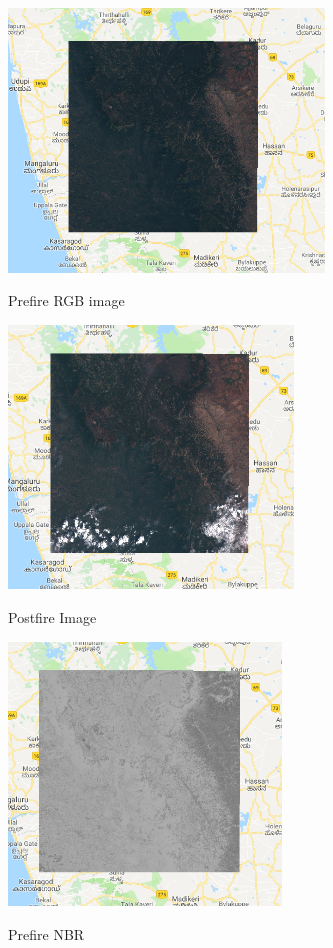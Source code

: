 \documentclass[12pt]{svproc}
\begin{document}
\begin{figure}{}
	\includegraphics[width=0.6\linewidth, height=7cm]{prefire.png} 
	\label{fig:subim1}
	\centering
	\caption{Prefire RGB image}
\end{figure}

\begin{figure}{}
	\includegraphics[width=0.6\linewidth, height=7cm]{postfire.png} 
	\label{fig:subim1}
	\centering
	\caption{Postfire Image}
\end{figure}

\begin{figure}{}
	\includegraphics[width=0.6\linewidth, height=7cm]{prenbr.png} 
	\label{fig:subim1}
	\centering
	\caption{Prefire NBR}
\end{figure}
\end{document}

